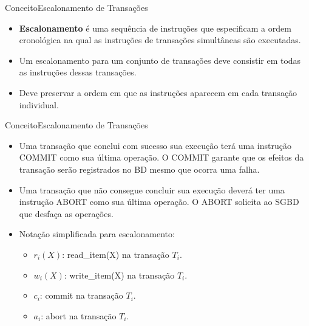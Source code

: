 \documentclass[t]{beamer}
\begin{document}

\begin{ftst}{Conceito}{Escalonamento de Transações}

\begin{itemize}
    \item \textbf{Escalonamento} é uma sequência de instruções que especificam a ordem cronológica na qual as instruções de transações simultâneas são executadas.
    \item Um escalonamento para um conjunto de transações deve consistir em todas as instruções dessas transações.
    \item Deve preservar a ordem em que as instruções aparecem em cada transação individual.
\end{itemize}
\end{ftst}


\begin{ftst}{Conceito}{Escalonamento de Transações}

\begin{itemize}
    \item Uma transação que conclui com sucesso sua execução terá uma instrução COMMIT como sua última operação. O COMMIT garante que os efeitos da transação serão registrados no BD mesmo que ocorra uma falha.
    \item Uma transação que não consegue concluir sua execução deverá ter uma instrução ABORT como sua última operação. O ABORT solicita ao SGBD que desfaça as operações.
    \item Notação simplificada para escalonamento:
    \begin{itemize}
        \item $r_i(X)$: read\_item(X) na transação $T_i$.
        \item $w_i(X)$: write\_item(X) na transação $T_i$.
        \item $c_i$: commit na transação $T_i$.
        \item $a_i$: abort na transação $T_i$.
    \end{itemize}
\end{itemize}
\end{ftst}

\end{document}
